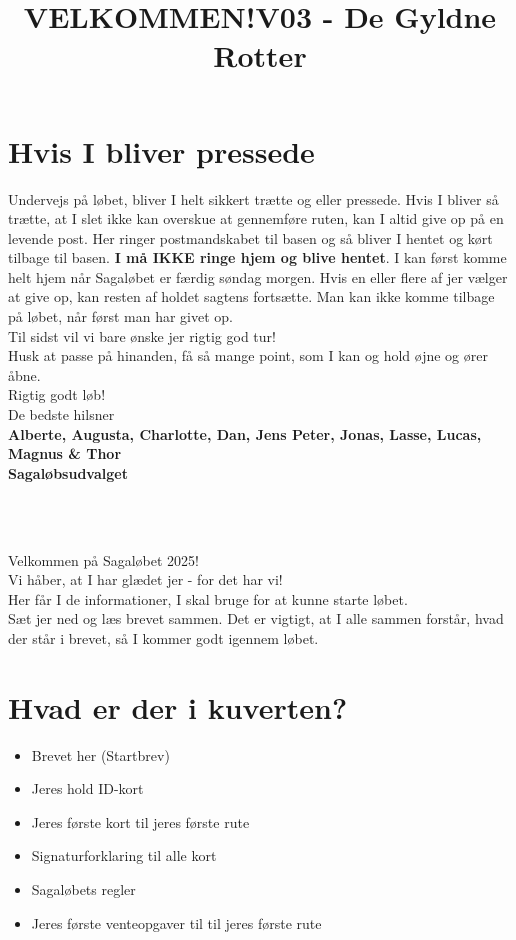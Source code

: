 \section{Hvis I bliver pressede}
Undervejs på løbet, bliver I helt sikkert trætte og eller pressede. Hvis I bliver så trætte, at I slet ikke kan overskue at gennemføre ruten, kan I altid give op på en levende post. Her ringer postmandskabet til basen og så bliver I hentet og kørt tilbage til basen. \textbf{I må IKKE ringe hjem og blive hentet}. I kan først komme helt hjem når Sagaløbet er færdig søndag morgen. Hvis en eller flere af jer vælger at give op, kan resten af holdet sagtens fortsætte. Man kan ikke komme tilbage på løbet, når først man har givet op.\\
\newline
Til sidst vil vi bare ønske jer rigtig god tur!\\
Husk at passe på hinanden, få så mange point, som I kan og hold øjne og ører åbne.\\
\newline
Rigtig godt løb!\\
\newline
\textcolor{søblå}{De bedste hilsner}\\
\textcolor{natblå}{\textbf{Alberte, Augusta, Charlotte, Dan, Jens Peter, Jonas, Lasse, Lucas, Magnus \& Thor}}\\
\textcolor{natblå}{\textbf{Sagaløbsudvalget}}\\
\newpage
\title{VELKOMMEN!}\\
\newline
\title{\textcolor{søblå}{V03 - De Gyldne Rotter }}\\
\newline
Velkommen på Sagaløbet 2025!\\
Vi håber, at I har glædet jer - for det har vi!\\
Her får I de informationer, I skal bruge for at kunne starte løbet.\\
Sæt jer ned og læs brevet sammen. Det er vigtigt, at I alle sammen forstår, hvad der står i brevet, så I kommer godt igennem løbet.
\section{Hvad er der i kuverten?}
\begin{itemize}
    \item Brevet her (Startbrev)
    \item Jeres hold ID-kort
    \item Jeres første kort til jeres første rute
    \item Signaturforklaring til alle kort
    \item Sagaløbets regler
    \item Jeres første venteopgaver til til jeres første rute
\end{itemize}
